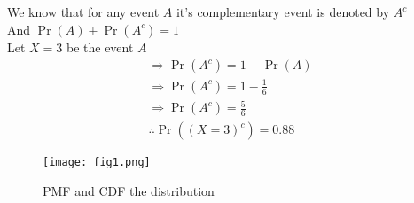 \documentclass[twocolumn,12pt]{article}
\providecommand{\pr}[1]{\ensuremath{\Pr\left(#1\right)}}
\begin{document}
We know that for any event $A$ it's complementary event is denoted by $A^{c}$\\
And $\pr{A} + \pr{A^{c}} = 1 $ \\
Let $X=3$ be the event $A$ \\
\begin{align}
\Rightarrow \pr{A^{c}}  = 1 - \pr{A} \\
\Rightarrow \pr{A^{c}}  = 1 - \frac{1}{6} \\
\Rightarrow \pr{A^{c}}  = \frac{5}{6} \\
\therefore \pr{(X=3)^{c}} = 0.88
\end{align}
\begin{figure}[h]
\texttt{[image: fig1.png]}
\caption{PMF and CDF the distribution}
\label{Fig 1}
\end{figure}
\end{document}
